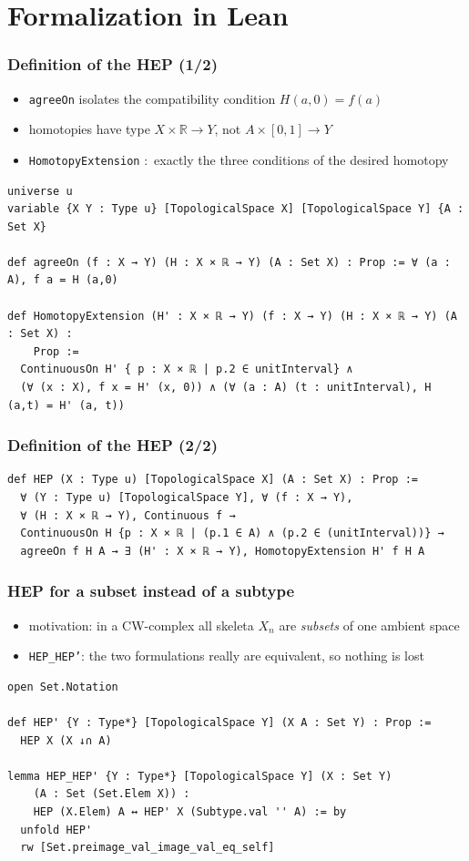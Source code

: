 \documentclass{beamer}
\begin{document}
\section{Formalization in Lean}

\begin{frame}[fragile]
\frametitle{Definition of the HEP (1/2)}
\begin{itemize}\footnotesize
\item \texttt{agreeOn} isolates the compatibility condition $H(a,0) = f(a)$
\item homotopies have type $X \times \mathbb{R} \to Y$, not $A \times [0,1] \to Y$
\item \texttt{HomotopyExtension} $\colon$ exactly the three conditions of the desired homotopy
\end{itemize}
\begin{lstlisting}
universe u
variable {X Y : Type u} [TopologicalSpace X] [TopologicalSpace Y] {A : Set X}

def agreeOn (f : X → Y) (H : X × ℝ → Y) (A : Set X) : Prop := ∀ (a : A), f a = H (a,0)

def HomotopyExtension (H' : X × ℝ → Y) (f : X → Y) (H : X × ℝ → Y) (A : Set X) :
    Prop :=
  ContinuousOn H' { p : X × ℝ | p.2 ∈ unitInterval} ∧
  (∀ (x : X), f x = H' (x, 0)) ∧ (∀ (a : A) (t : unitInterval), H (a,t) = H' (a, t))
\end{lstlisting}
\end{frame}

\begin{frame}[fragile]
\frametitle{Definition of the HEP (2/2)}
\begin{lstlisting}
def HEP (X : Type u) [TopologicalSpace X] (A : Set X) : Prop :=
  ∀ (Y : Type u) [TopologicalSpace Y], ∀ (f : X → Y), 
  ∀ (H : X × ℝ → Y), Continuous f → 
  ContinuousOn H {p : X × ℝ | (p.1 ∈ A) ∧ (p.2 ∈ (unitInterval))} → 
  agreeOn f H A → ∃ (H' : X × ℝ → Y), HomotopyExtension H' f H A
\end{lstlisting}
\end{frame}

\begin{frame}[fragile]
\frametitle{HEP for a subset instead of a subtype}
\begin{itemize}
\item motivation: in a CW-complex all skeleta $X_n$ are \emph{subsets} of one ambient space
\item \texttt{HEP\_HEP'}: the two formulations really are equivalent, so nothing is lost
\end{itemize}
\begin{lstlisting}
open Set.Notation

def HEP' {Y : Type*} [TopologicalSpace Y] (X A : Set Y) : Prop := 
  HEP X (X ↓∩ A)

lemma HEP_HEP' {Y : Type*} [TopologicalSpace Y] (X : Set Y) 
    (A : Set (Set.Elem X)) : 
    HEP (X.Elem) A ↔ HEP' X (Subtype.val '' A) := by
  unfold HEP'
  rw [Set.preimage_val_image_val_eq_self]
\end{lstlisting}
\end{frame}
\end{document}
